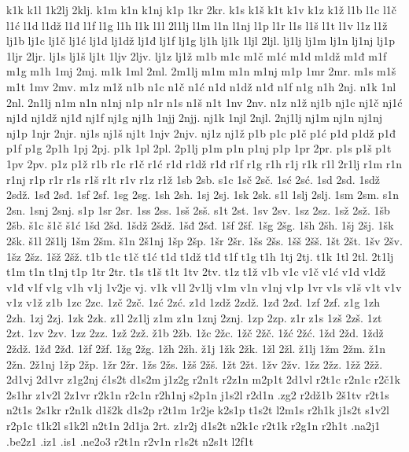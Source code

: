 {k1k
k1l
1k2lj
2klj.
k1m
k1n
k1nj
k1p
1kr
2kr.
k1s
k1š
k1t
k1v
k1z
k1ž
l1b
l1c
l1č
l1ć
l1d
l1dž
l1đ
l1f
l1g
l1h
l1k
l1l
2l1lj
l1m
l1n
l1nj
l1p
l1r
l1s
l1š
l1t
l1v
l1z
l1ž
lj1b
lj1c
lj1č
lj1ć
lj1d
lj1dž
lj1đ
lj1f
lj1g
lj1h
lj1k
1ljl
2ljl.
lj1lj
lj1m
lj1n
lj1nj
lj1p
1ljr
2ljr.
lj1s
lj1š
lj1t
1ljv
2ljv.
lj1z
lj1ž
m1b
m1c
m1č
m1ć
m1d
m1dž
m1đ
m1f
m1g
m1h
1mj
2mj.
m1k
1ml
2ml.
2m1lj
m1m
m1n
m1nj
m1p
1mr
2mr.
m1s
m1š
m1t
1mv
2mv.
m1z
m1ž
n1b
n1c
n1č
n1ć
n1d
n1dž
n1đ
n1f
n1g
n1h
2nj.
n1k
1nl
2nl.
2n1lj
n1m
n1n
n1nj
n1p
n1r
n1s
n1š
n1t
1nv
2nv.
n1z
n1ž
nj1b
nj1c
nj1č
nj1ć
nj1d
nj1dž
nj1đ
nj1f
nj1g
nj1h
1njj
2njj.
nj1k
1njl
2njl.
2nj1lj
nj1m
nj1n
nj1nj
nj1p
1njr
2njr.
nj1s
nj1š
nj1t
1njv
2njv.
nj1z
nj1ž
p1b
p1c
p1č
p1ć
p1d
p1dž
p1đ
p1f
p1g
2p1h
1pj
2pj.
p1k
1pl
2pl.
2p1lj
p1m
p1n
p1nj
p1p
1pr
2pr.
p1s
p1š
p1t
1pv
2pv.
p1z
p1ž
r1b
r1c
r1č
r1ć
r1d
r1dž
r1đ
r1f
r1g
r1h
r1j
r1k
r1l
2r1lj
r1m
r1n
r1nj
r1p
r1r
r1s
r1š
r1t
r1v
r1z
r1ž
1sb
2sb.
s1c
1sč
2sč.
1sć
2sć.
1sd
2sd.
1sdž
2sdž.
1sđ
2sđ.
1sf
2sf.
1sg
2sg.
1sh
2sh.
1sj
2sj.
1sk
2sk.
s1l
1slj
2slj.
1sm
2sm.
s1n
2sn.
1snj
2snj.
s1p
1sr
2sr.
1ss
2ss.
1sš
2sš.
s1t
2st.
1sv
2sv.
1sz
2sz.
1sž
2sž.
1šb
2šb.
š1c
š1č
š1ć
1šd
2šd.
1šdž
2šdž.
1šđ
2šđ.
1šf
2šf.
1šg
2šg.
1šh
2šh.
1šj
2šj.
1šk
2šk.
š1l
2š1lj
1šm
2šm.
š1n
2š1nj
1šp
2šp.
1šr
2šr.
1šs
2šs.
1šš
2šš.
1št
2št.
1šv
2šv.
1šz
2šz.
1šž
2šž.
t1b
t1c
t1č
t1ć
t1d
t1dž
t1đ
t1f
t1g
t1h
1tj
2tj.
t1k
1tl
2tl.
2t1lj
t1m
t1n
t1nj
t1p
1tr
2tr.
t1s
t1š
t1t
1tv
2tv.
t1z
t1ž
v1b
v1c
v1č
v1ć
v1d
v1dž
v1đ
v1f
v1g
v1h
v1j
1v2je
vj.
v1k
v1l
2v1lj
v1m
v1n
v1nj
v1p
1vr
v1s
v1š
v1t
v1v
v1z
v1ž
z1b
1zc
2zc.
1zč
2zč.
1zć
2zć.
z1d
1zdž
2zdž.
1zđ
2zđ.
1zf
2zf.
z1g
1zh
2zh.
1zj
2zj.
1zk
2zk.
z1l
2z1lj
z1m
z1n
1znj
2znj.
1zp
2zp.
z1r
z1s
1zš
2zš.
1zt
2zt.
1zv
2zv.
1zz
2zz.
1zž
2zž.
ž1b
2žb.
1žc
2žc.
1žč
2žč.
1žć
2žć.
1žd
2žd.
1ždž
2ždž.
1žđ
2žđ.
1žf
2žf.
1žg
2žg.
1žh
2žh.
ž1j
1žk
2žk.
1žl
2žl.
ž1lj
1žm
2žm.
ž1n
2žn.
2ž1nj
1žp
2žp.
1žr
2žr.
1žs
2žs.
1žš
2žš.
1žt
2žt.
1žv
2žv.
1žz
2žz.
1žž
2žž.
2d1vj
2d1vr
z1g2nj
ć1s2t
d1s2m
j1z2g
r2n1t
r2z1n
m2p1t
2d1vl
r2t1c
r2n1c
r2č1k
2s1hr
z1v2l
2z1vr
r2k1n
r2c1n
r2h1nj
s2p1n
j1s2l
r2d1n
.zg2
r2dž1b
2š1tv
r2t1s
n2t1s
2s1kr
r2n1k
d1š2k
d1s2p
r2t1m
1r2je
k2s1p
t1s2t
l2m1s
r2h1k
j1s2t
s1v2l
r2p1c
t1k2l
s1k2l
n2t1n
2d1ja
2rt.
z1r2j
d1s2t
n2k1c
r2t1k
r2g1n
r2h1t
.na2j1
.be2z1
.iz1
.is1
.ne2o3
r2t1n
r2v1n
r1s2t
n2s1t
l2f1t
}